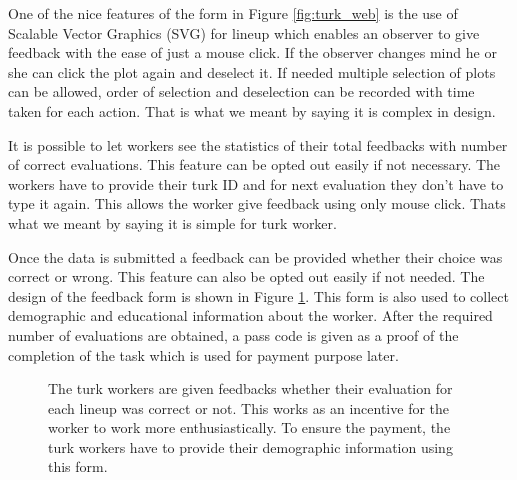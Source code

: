 \documentclass[11pt]{article}
\begin{document}
One of the nice features of the form in Figure \ref{fig:turk_web} is the use of Scalable Vector Graphics (SVG) for lineup which enables an observer to give feedback with the ease of just a mouse click. If the observer changes mind he or she can click the plot again and deselect it. If needed multiple selection of plots can be allowed, order of selection and deselection can be recorded with time taken for each action. That is what we meant by saying it is complex in design. 

It is possible to let workers see the statistics of their total feedbacks with number of correct evaluations. This feature can be opted out easily if not necessary. The workers have to provide their turk ID and for next evaluation they don't have to type it again. This allows the worker give feedback using only mouse click. Thats what we meant by saying it is simple for turk worker.

Once the data is submitted a feedback can be provided whether their choice was correct or wrong. This feature can also be opted out easily if not needed. The design of the feedback form is shown in Figure \ref{fig:turk_web_feedback}. This form is also used to collect demographic and educational information about the worker. After the required number of evaluations are obtained, a pass code is given as a proof of the completion of the task which is used for payment purpose later.

\begin{figure}[hbtp]
   \centering
       \caption{The turk workers are given feedbacks whether their evaluation for each lineup was correct or not. This works as an incentive for the worker to work more enthusiastically. To ensure the payment, the turk workers have to provide their demographic information using this form.}
       \label{fig:turk_web_feedback}
\end{figure}
\end{document}
